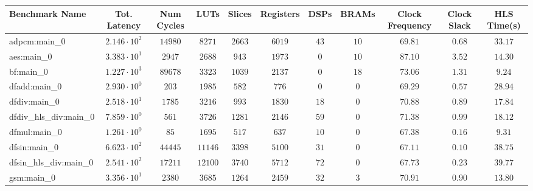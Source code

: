 \begin{tabular}{|l|c|c|c|c|c|c|c|c|c|c|}
\hline
Benchmark Name          & Tot. Latency           & Num Cycles & LUTs      & Slices    & Registers & DSPs    & BRAMs   & Clock Frequency & Clock Slack & HLS Time(s) \\
\hline
adpcm:main\_0           & $ 2.146 \cdot 10^{2} $ & $ 14980  $ & $ 8271  $ & $ 2663  $ & $ 6019  $ & $ 43  $ & $ 10  $ & $ 69.81       $ & $ 0.68    $ & $ 33.17   $ \\
aes:main\_0             & $ 3.383 \cdot 10^{1} $ & $ 2947   $ & $ 2688  $ & $ 943   $ & $ 1973  $ & $ 0   $ & $ 10  $ & $ 87.10       $ & $ 3.52    $ & $ 14.30   $ \\
bf:main\_0              & $ 1.227 \cdot 10^{3} $ & $ 89678  $ & $ 3323  $ & $ 1039  $ & $ 2137  $ & $ 0   $ & $ 18  $ & $ 73.06       $ & $ 1.31    $ & $ 9.24    $ \\
dfadd:main\_0           & $ 2.930 \cdot 10^{0} $ & $ 203    $ & $ 1985  $ & $ 582   $ & $ 776   $ & $ 0   $ & $ 0   $ & $ 69.29       $ & $ 0.57    $ & $ 28.94   $ \\
dfdiv:main\_0           & $ 2.518 \cdot 10^{1} $ & $ 1785   $ & $ 3216  $ & $ 993   $ & $ 1830  $ & $ 18  $ & $ 0   $ & $ 70.88       $ & $ 0.89    $ & $ 17.84   $ \\
dfdiv\_hls\_div:main\_0 & $ 7.859 \cdot 10^{0} $ & $ 561    $ & $ 3726  $ & $ 1281  $ & $ 2146  $ & $ 59  $ & $ 0   $ & $ 71.38       $ & $ 0.99    $ & $ 18.12   $ \\
dfmul:main\_0           & $ 1.261 \cdot 10^{0} $ & $ 85     $ & $ 1695  $ & $ 517   $ & $ 637   $ & $ 10  $ & $ 0   $ & $ 67.38       $ & $ 0.16    $ & $ 9.31    $ \\
dfsin:main\_0           & $ 6.623 \cdot 10^{2} $ & $ 44445  $ & $ 11146 $ & $ 3398  $ & $ 5100  $ & $ 31  $ & $ 0   $ & $ 67.11       $ & $ 0.10    $ & $ 38.75   $ \\
dfsin\_hls\_div:main\_0 & $ 2.541 \cdot 10^{2} $ & $ 17211  $ & $ 12100 $ & $ 3740  $ & $ 5712  $ & $ 72  $ & $ 0   $ & $ 67.73       $ & $ 0.23    $ & $ 39.77   $ \\
gsm:main\_0             & $ 3.356 \cdot 10^{1} $ & $ 2380   $ & $ 3685  $ & $ 1264  $ & $ 2459  $ & $ 32  $ & $ 3   $ & $ 70.91       $ & $ 0.90    $ & $ 13.80   $ \\

\end{tabular}
